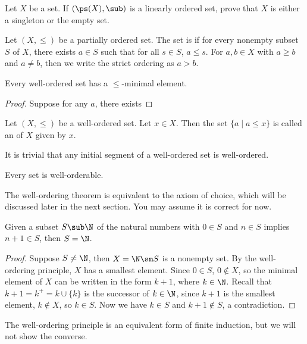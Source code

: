 \documentclass[10pt]{article}
\begin{document}
\begin{problem}
    Let $X$ be a set. If $(\ps(X),\sub)$ is a linearly ordered set, prove that $X$ is either a singleton or the empty set.
\end{problem}
\begin{definition}
    Let $(X,\le)$ be a partially ordered set. The set is  if for every nonempty subset $S$ of $X$, there exists $a\in S$ such that for all $s\in S$, $a\le s$. For $a,b\in X$ with $a\ge b$ and $a\ne b$, then we write the strict ordering as $a>b$.
\end{definition}


\begin{proposition}
    Every well-ordered set has a $\le$-minimal element.
\end{proposition}
\begin{proof}
    Suppose for any $a$, there exists 
\end{proof}
\begin{definition}
    Let $(X,\le)$ be a well-ordered set. Let $x\in X$. Then the set $\{a\mid a\le x\}$ is called an  of $X$ given by $x$.
\end{definition}
\par
It is trivial that any initial segment of a well-ordered set is well-ordered.
\begin{theorem}
    Every set is well-orderable.
\end{theorem}
\par
The well-ordering theorem is equivalent to the axiom of choice, which will be discussed later in the next section. You may assume it is correct for now. 
\begin{theorem}
    Given a subset $S\sub\N$ of the natural numbers with $0\in S$ and $n\in S$ implies $n+1\in S$, then $S=\N$.
\end{theorem}
\begin{proof}
    Suppose $S\ne\N$, then $X=\N\sm S$ is a nonempty set. By the well-ordering principle, $X$ has a smallest element. Since $0\in S$, $0\notin X$, so the minimal element of $X$ can be written in the form $k+1$, where $k\in\N$. Recall that $k+1={k}^{+}=k\cup\{k\}$ is the successor of $k\in\N$, since $k+1$ is the smallest element, $k\notin X$, so $k\in S$. Now we have $k\in S$ and $k+1\notin S$, a contradiction.
\end{proof}
\par
The well-ordering principle is an equivalent form of finite induction, but we will not show the converse.
\end{document}
